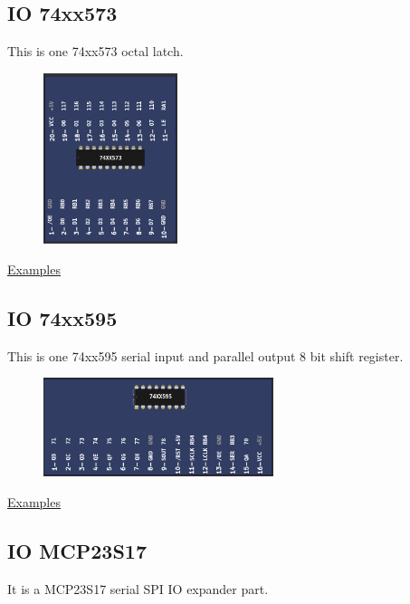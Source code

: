 \subsection{IO 74xx573}

This is one 74xx573 octal latch.

\begin{figure}[H]
\center
\includegraphics[width=0.35\textwidth]{img/part_74xx573.png} 
\end{figure} 

\href{https://lcgamboa.github.io/picsimlab_examples/parts_IO_74xx573.html}{Examples} 

\subsection{IO 74xx595}

This is one 74xx595 serial input and parallel output 8 bit shift register.

\begin{figure}[H]
\center
\includegraphics[width=0.6\textwidth]{img/part_74xx595.png} 
\end{figure} 

\href{https://lcgamboa.github.io/picsimlab_examples/parts_IO_74xx595.html}{Examples}

\subsection{IO MCP23S17}

It is a MCP23S17 serial SPI IO expander part.

